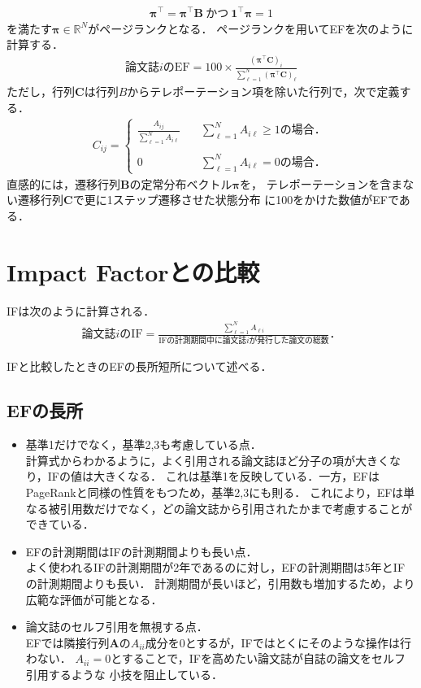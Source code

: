 \begin{align*}
    \bm{\pi}^{\top} = \bm{\pi}^{\top}\bm{B}~\text{かつ}~ \bm{1}^{\top}\bm{\pi}=1
\end{align*}
を満たす$\bm{\pi} \in \mathbb{R}^N$がページランクとなる．
ページランクを用いてEFを次のように計算する．
\begin{align*}
    \text{論文誌$i$のEF} = 100 \times \frac{( \bm{\pi}^{\top} \bm{C} )_i}{\sum_{\ell=1}^N ( \bm{\pi}^{\top} \bm{C} )_{\ell}}
\end{align*}
ただし，行列$\bm{C}$は行列$B$からテレポーテーション項を除いた行列で，次で定義する\cite{Masuda2013}．
\begin{align*}
    C_{ij} =
    \begin{cases}
        \frac{A_{ij}}{\sum_{\ell=1}^N A_{i\ell}}
        &\quad \sum_{\ell=1}^N A_{i\ell} \geq 1\text{の場合．} \\
        \\
        0
        &\quad \sum_{\ell=1}^N A_{i\ell} =0\text{の場合．} 
    \end{cases}
\end{align*}
直感的には，遷移行列$\bm{B}$の定常分布ベクトル$\bm{\pi}$を，
テレポーテーションを含まない遷移行列$\bm{C}$で更に1ステップ遷移させた状態分布
に100をかけた数値がEFである．


\section{Impact Factorとの比較}
IFは次のように計算される．
\begin{align*}
    \text{論文誌$i$のIF}
    = \frac{\sum_{\ell=1}^N A_{\ell i}}{\text{IFの計測期間中に論文誌$i$が発行した論文の総数}}．
\end{align*}

IFと比較したときのEFの長所短所について述べる．
\subsection{EFの長所~\cite{Massimo2010}}
\begin{itemize}
    \item 基準1だけでなく，基準2,3も考慮している点．\\
    計算式からわかるように，よく引用される論文誌ほど分子の項が大きくなり，IFの値は大きくなる．
    これは基準1を反映している．一方，EFはPageRankと同様の性質をもつため，基準2,3にも則る．
    これにより，EFは単なる被引用数だけでなく，どの論文誌から引用されたかまで考慮することができている．
    \item EFの計測期間はIFの計測期間よりも長い点． \\
    よく使われるIFの計測期間が2年であるのに対し，EFの計測期間は5年とIFの計測期間よりも長い．
    計測期間が長いほど，引用数も増加するため，より広範な評価が可能となる．
    \item 論文誌のセルフ引用を無視する点． \\
    EFでは隣接行列$\bm{A}$の$A_{ii}$成分を0とするが，IFではとくにそのような操作は行わない．
    $A_{ii}=0$とすることで，IFを高めたい論文誌が自誌の論文をセルフ引用するような
    小技を阻止している．
\end{itemize}

